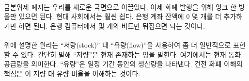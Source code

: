 \paragraph{}
\begin{comment}	
	The abolishment of the gold standard gave way to a new reality: adding new money
	requires just a drop of ink. In our modern world adding a couple of zeros to the
	balance of a bank account requires even less effort: flipping a few bits in a
	bank computer is enough.
\end{comment}
금본위제 폐지는 우리를 새로운 국면으로 이끌었다.
이제 화폐 발행을 위해 잉크 한 방울만 있으면 된다.
현대 사회에서는 훨씬 쉽다. 은행 계좌 잔액에 0 몇 개를 더 추가하기만 하면 된다.
은행 컴퓨터에서 몇 개의 비트만 뒤집으면 되는 것이다.

\paragraph{}
\begin{comment}	
	The principle outlined above can be expressed more generally as the
	ratio of \enquote{stock} to \enquote{flow}. Simply put, the \textit{stock} is how much of
	something is currently there. For our purposes, the stock is a measure
	of the current money supply. The \textit{flow} is how much there is produced
	over a period of time (e.g. per year). The key to understanding sound
	money is in understanding this stock-to-flow ratio.
\end{comment}
위에 설명한 원리는 \enquote{저량(stock)} 대 \enquote{유량(flow)}을 사용하여 좀 더 일반적으로 표현할 수 있다.
간단히 말해 \enquote{저량}은 현재 존재하는 양을 말한다. 여기에서는 현재 통화 공급량을 의미한다. 
\enquote{유량}은 일정 기간 동안의 생산량을 나타낸다.
건전 화폐 이해의 핵심은 이 저량 대 유량 비율을 이해하는 것이다.

